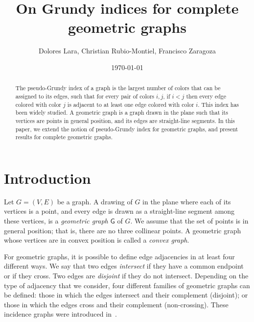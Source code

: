 \documentclass[11pt]{article}
\title{On Grundy indices for complete geometric graphs}
\author{Dolores Lara\footnotemark[1], Christian Rubio-Montiel\footnotemark[2], Francisco Zaragoza\footnotemark[3]}
\date{\today}
\begin{document}
\maketitle

\def\thefootnote{\fnsymbol{footnote}}




\begin{abstract}
    The pseudo-Grundy index of a graph is the largest number of colors that can be assigned to its edges, such that for every pair of colors $i,j$, if $i < j$ then every edge colored with color $j$ is adjacent to at least one edge colored with color $i$. This index has been widely studied. A geometric graph is a graph drawn in the plane such that its vertices are points in general position, and its edges are straight-line segments. In this paper, we extend the notion of pseudo-Grundy index for geometric graphs, and present results for complete geometric graphs.
\end{abstract}


\section{Introduction} 

Let $G = (V,E)$ be a graph. A drawing of $G$ in the plane where each of its vertices is a point, and every edge is drawn as a straight-line segment among these vertices, is a \emph{geometric graph} $\mathsf{G}$ of $G$. We assume that the set of points is in general position; that is, there are no three collinear points. A geometric graph whose vertices are in convex position is called a \emph{convex graph}. 

For geometric graphs, it is possible to define edge adjacencies in at least four different ways. We say that two edges \emph{intersect} if they have a common endpoint or if they cross. Two edges are \emph{disjoint} if they do not intersect. Depending on the type of adjacency that we consider, four different families of geometric graphs can be defined: those in which the edges intersect and their complement (disjoint); or those in which the edges cross and their complement (non-crossing). These incidence graphs were introduced in~\cite{MR2155418}.
\end{document}
